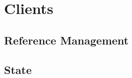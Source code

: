 \section{Clients}
{ \textcolor{gray}\blindtext }

\subsection{Reference Management}
{ \textcolor{gray}\blindtext }

\subsection{State}
{ \textcolor{gray}\blindtext }
